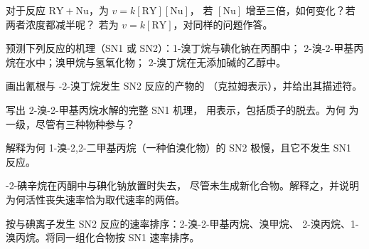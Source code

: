 \begin{exercise}[$\star$]\label{exo:b1:nucleophilic-substitution:2}
对于反应 $\mathrm{RY} + \mathrm{Nu}$，为 $v = k[\mathrm{RY}][\mathrm{Nu}]$，
若 $[\mathrm{Nu}]$ 增至三倍，如何变化？若两者浓度都减半呢？
若为 $v = k[\mathrm{RY}]$，对同样的问题作答。
\end{exercise}

\begin{exercise}[$\star$]\label{exo:b1:nucleophilic-substitution:3}
预测下列反应的机理（SN1 或 SN2）：1-溴丁烷与碘化钠在丙酮中；
2-溴-2-甲基丙烷在水中；溴甲烷与氢氧化物；
2-溴丁烷在无添加碱的乙醇中。
\end{exercise}

\begin{exercise}[$\star$]\label{exo:b1:nucleophilic-substitution:4}
画出氰根与 -2-溴丁烷发生 SN2 反应的产物的
（克拉姆表示），并给出其描述符。
\end{exercise}

\begin{exercise}[$\star\star$]\label{exo:b1:nucleophilic-substitution:5}
写出 2-溴-2-甲基丙烷水解的完整 SN1 机理，
用表示，包括质子的脱去。为何
为一级，尽管有三种物种参与？
\end{exercise}

\begin{exercise}[$\star\star$]\label{exo:b1:nucleophilic-substitution:6}
解释为何 1-溴-2,2-二甲基丙烷（一种伯溴化物）的 SN2 极慢，且它不发生 SN1 反应。
\end{exercise}

\begin{exercise}[$\star\star$]\label{exo:b1:nucleophilic-substitution:7}
-2-碘辛烷在丙酮中与碘化钠放置时失去，
尽管未生成新化合物。解释之，并说明
为何活性丧失速率恰为取代速率的两倍。
\end{exercise}

\begin{exercise}[$\star\star$]\label{exo:b1:nucleophilic-substitution:8}
按与碘离子发生 SN2 反应的速率排序：2-溴-2-甲基丙烷、溴甲烷、
2-溴丙烷、1-溴丙烷。将同一组化合物按 SN1
速率排序。
\end{exercise}

